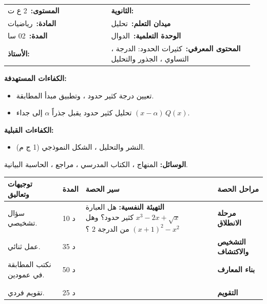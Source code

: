 \documentclass[12pt,a4paper]{article}
\makeatletter
\newenvironment{LTR}{\begin{otherlanguage}{english}}{\end{otherlanguage}}
\newcommand{\ar}[1]{\foreignlanguage{arabic}{#1}}
\renewcommand{\cdots}{\mathinner{\cdotp\cdotp\cdotp}}
\newcommand{\Phase}[1]{\textbf{#1}}
\newcommand{\Fld}[2]{\textbf{#1:}\ #2}
\newcommand{\ModhHead}[9]{%
\begin{LTR}
\begin{tcolorbox}[enhanced,colback=white,colframe=cThm!85!black,arc=4mm,boxrule=1pt,top=14pt,bottom=6pt,left=8pt,right=8pt,
 overlay={\node[fill=cThm!85!black,text=white,rounded corners=3mm,inner xsep=14pt,inner ysep=4pt,font=\large\bfseries] at ([yshift=0pt]frame.north){\ar{مذكرة رقم #1}};},
 before upper={\selectlanguage{arabic}}]
\begin{tabular}{@{}p{0.4\linewidth}p{0.55\linewidth}@{}}
\Fld{المستوى}{#2} & \Fld{الثانوية}{\dotfill}\\[3pt]
\Fld{المادة}{رياضيات} & \Fld{ميدان التعلم}{#3}\\[3pt]
\Fld{المدة}{#5} & \Fld{الوحدة التعلمية}{#4}\\[3pt]
\Fld{الأستاذ}{\dotfill} & \Fld{المحتوى المعرفي}{#6}\\
\end{tabular}
\end{tcolorbox}
\begin{tcolorbox}[enhanced,colback=white,colframe=cThm!85!black,arc=3mm,boxrule=0.8pt,sidebyside,sidebyside align=top,lefthand ratio=0.5,
 segmentation style={dashed,cThm!60},before upper={\selectlanguage{arabic}},before lower={\selectlanguage{arabic}}]
\textbf{الكفاءات المستهدفة:}\par #8
\tcblower
\textbf{الكفاءات القبلية:}\par #7
\end{tcolorbox}
\end{LTR}
\par\smallskip\textbf{الوسائل:} #9\par\smallskip}
\newenvironment{Sayr}{%
\begin{LTR}\renewcommand{\arraystretch}{1.25}
\begin{longtable}{|p{0.17\textwidth}|>{\centering\arraybackslash}p{0.06\textwidth}|p{0.53\textwidth}|>{\centering\arraybackslash}p{0.12\textwidth}|}
\hline\rowcolor{cThm!12}\ar{\textbf{توجيهات وتعاليق}} & \ar{\textbf{المدة}} & \ar{\textbf{سير الحصة}} & \ar{\textbf{مراحل الحصة}}\\\hline\endhead
\hline\endfoot}{\end{longtable}\end{LTR}}
\newcommand{\Row}[4]{\ar{\small #4} & \ar{#3} & \ar{#2} & \cellcolor{cThm!8}\ar{\Phase{#1}}\\\hline}
\newcommand{\Lab}[2]{\foreignlanguage{english}{\tcbox[on line,colback=#1,colframe=#1,boxrule=0pt,arc=2pt,boxsep=1pt,left=5pt,right=5pt,top=1pt,bottom=1pt]{\ar{\textcolor{white}{\textbf{#2}}}}}}
\newcommand{\ck}{\ensuremath{{\color{cRem}\checkmark}}}
\makeatother
\begin{document}
\newpage
\ModhHead{07}{2 ع ت}{تحليل}{الدوال}{02 سا}{كثيرات الحدود: الدرجة ، التساوي ، الجذور والتحليل}%
{\begin{itemize}\item النشر والتحليل ، الشكل النموذجي (1 ج م).\end{itemize}}%
{\begin{itemize}\item تعيين درجة كثير حدود ، وتطبيق مبدأ المطابقة.\item تحليل كثير حدود يقبل جذراً $\alpha$ إلى جداء $(x-\alpha)\,Q(x)$.\end{itemize}}%
{المنهاج ، الكتاب المدرسي ، مراجع ، الحاسبة البيانية.}
\begin{Sayr}
\Row{مرحلة الانطلاق}{%
\textbf{التهيئة النفسية:} هل العبارة $x^3-2x+\sqrt x$ كثير حدود؟ وهل $(x+1)^2-x^2$ من الدرجة $2$ ؟}{10 د}{سؤال تشخيصي.}
\Row{التشخيص والاكتشاف}{%
\Lab{cEx}{مناقشة النشاطين 01 و 02 صفحة 36}\par\ck\ نشر وترتيب عبارة كثير حدود ، وتعيين درجتها.\par
\ck\ اختيار الشكل المناسب (منشور ، محلل ، نموذجي) لحل معادلات.\par
}{35 د}{عمل ثنائي.}
\Row{بناء المعارف}{%
\Lab{cDef}{تعريف}\ $P(x)=a_nx^n+a_{n-1}x^{n-1}+\cdots+a_1x+a_0$ مع $a_n\neq0$: \textbf{درجته} $n$ ، و $a_n$ معامله الأعلى.\par\Lab{cThm}{تساوي كثيري حدود}\ يتساوى كثيرا حدود إذا وفقط إذا كانا من نفس الدرجة ومعاملات الحدود من نفس الدرجة متساوية (\textbf{مبدأ المطابقة}).\par}{50 د}{نكتب المطابقة في عمودين.}
\Row{}{%
\Lab{cDef}{الجذر}\ $\alpha$ جذر لـ $P$ إذا كان $P(\alpha)=0$.\par\Lab{cThm}{التحليل}\ إذا كان $\alpha$ جذراً لكثير حدود $P$ درجته $n\geqslant1$ ، فإن $P(x)=(x-\alpha)\,Q(x)$ حيث $Q$ كثير حدود درجته $n-1$.\par}{}{}
\Row{}{%
\Lab{cEx}{مثال}\ $P(x)=x^3-2x^2-5x+6$: $P(1)=0$. نضع $P(x)=(x-1)(ax^2+bx+c)=ax^3+(b-a)x^2+(c-b)x-c$.\par\ck\ بالمطابقة: $a=1$ ، $b-a=-2$ ، $c-b=-5$ ، $-c=6$ ، إذن $a=1$ ، $b=-1$ ، $c=-6$.\par
\ck\ $P(x)=(x-1)(x^2-x-6)=(x-1)(x+2)(x-3)$.\par
\Lab{cThm!80!black}{حذار}\ نتحقق دائماً من المعادلة الأخيرة ($-c=6$) لأنها تختبر صحة الجذر.}{}{}
\Row{التقويم}{%
\Lab{cEx}{تطبيق}\par $Q(x)=2x^3-3x^2-3x+2$. تحقق أن $2$ جذر لـ $Q$ ، ثم حلل $Q(x)$.\par\textbf{الحل:} $Q(2)=16-12-6+2=0$ ؛ بالمطابقة $Q(x)=(x-2)(2x^2+x-1)$ ؛ $\Delta=9$ ، والجذران $\frac12$ و $-1$: $Q(x)=(x-2)(2x-1)(x+1)$.\par\textbf{واجب منزلي:} تمارين من الكتاب المدرسي.\par\smallskip\textbf{ملاحظات حول سير الحصة:} \dotfill}{25 د}{تقويم فردي.}
\end{Sayr}
\end{document}
